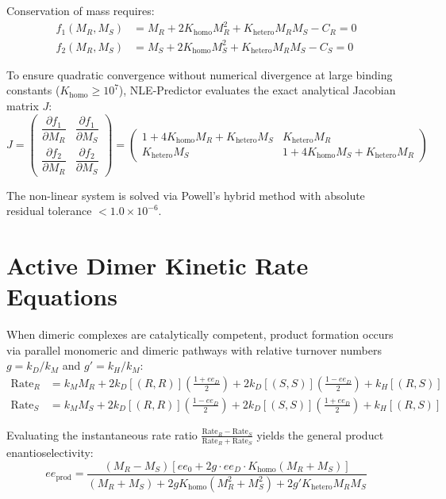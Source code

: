 \documentclass[11pt,a4paper]{article}
\begin{document}
Conservation of mass requires:
\begin{align}
f_1(M_R, M_S) &= M_R + 2 K_{\text{homo}} M_R^2 + K_{\text{hetero}} M_R M_S - C_R = 0 \\
f_2(M_R, M_S) &= M_S + 2 K_{\text{homo}} M_S^2 + K_{\text{hetero}} M_R M_S - C_S = 0
\end{align}

To ensure quadratic convergence without numerical divergence at large binding constants ($K_{\text{homo}} \ge 10^7$), NLE-Predictor evaluates the exact analytical Jacobian matrix $J$:
\begin{equation}
J = \begin{pmatrix}
\dfrac{\partial f_1}{\partial M_R} & \dfrac{\partial f_1}{\partial M_S} \\[10pt]
\dfrac{\partial f_2}{\partial M_R} & \dfrac{\partial f_2}{\partial M_S}
\end{pmatrix} = \begin{pmatrix}
1 + 4 K_{\text{homo}} M_R + K_{\text{hetero}} M_S & K_{\text{hetero}} M_R \\[8pt]
K_{\text{hetero}} M_S & 1 + 4 K_{\text{homo}} M_S + K_{\text{hetero}} M_R
\end{pmatrix}
\end{equation}

The non-linear system is solved via Powell's hybrid method with absolute residual tolerance $< 1.0 \times 10^{-6}$.

\section{Active Dimer Kinetic Rate Equations}

When dimeric complexes are catalytically competent, product formation occurs via parallel monomeric and dimeric pathways with relative turnover numbers $g = k_D / k_M$ and $g' = k_H / k_M$:
\begin{align}
\text{Rate}_R &= k_M M_R + 2 k_D [(R,R)] \left( \frac{1 + ee_D}{2} \right) + 2 k_D [(S,S)] \left( \frac{1 - ee_D}{2} \right) + k_H [(R,S)] \\
\text{Rate}_S &= k_M M_S + 2 k_D [(R,R)] \left( \frac{1 - ee_D}{2} \right) + 2 k_D [(S,S)] \left( \frac{1 + ee_D}{2} \right) + k_H [(R,S)]
\end{align}

Evaluating the instantaneous rate ratio $\frac{\text{Rate}_R - \text{Rate}_S}{\text{Rate}_R + \text{Rate}_S}$ yields the general product enantioselectivity:
\begin{equation}
ee_{\text{prod}} = \frac{(M_R - M_S) \left[ ee_0 + 2 g \cdot ee_D \cdot K_{\text{homo}} (M_R + M_S) \right]}{(M_R + M_S) + 2 g K_{\text{homo}} (M_R^2 + M_S^2) + 2 g' K_{\text{hetero}} M_R M_S}
\end{equation}
\end{document}
